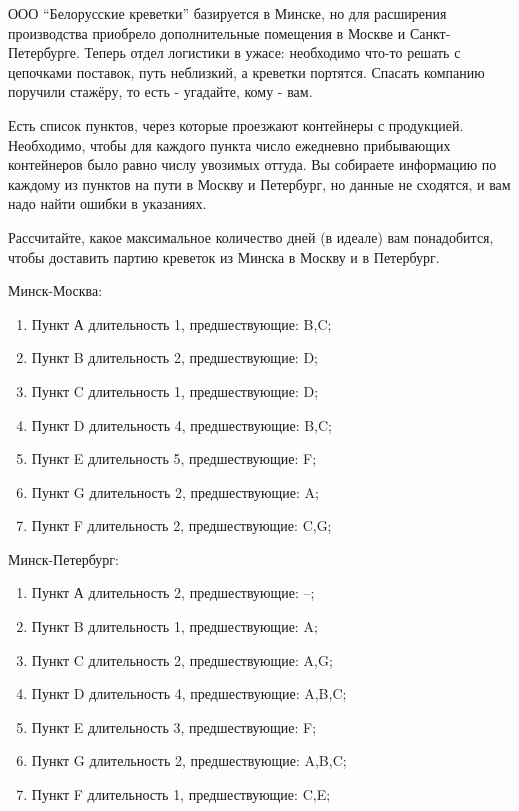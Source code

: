 \question
ООО “Белорусские креветки” базируется в Минске, но для расширения производства приобрело дополнительные помещения в Москве и Санкт-Петербурге. Теперь отдел логистики в ужасе: необходимо что-то решать с цепочками поставок, путь неблизкий, а креветки портятся. Спасать компанию поручили стажёру, то есть - угадайте, кому - вам.

Есть список пунктов, через которые проезжают контейнеры с продукцией. Необходимо, чтобы для каждого пункта число ежедневно прибывающих контейнеров было равно числу увозимых оттуда. Вы собираете информацию по каждому из пунктов на пути в Москву и Петербург, но данные не сходятся, и вам надо найти ошибки в указаниях.

Рассчитайте, какое максимальное количество дней (в идеале) вам понадобится, чтобы доставить партию креветок из Минска в Москву и в Петербург.


Минск-Москва:
\begin{enumerate}
\item Пункт А длительность 1, предшествующие: B,C;
\item Пункт B длительность 2, предшествующие: D;
\item Пункт C длительность 1, предшествующие: D;
\item Пункт D длительность 4, предшествующие: B,C;
\item Пункт E длительность 5, предшествующие: F;
\item Пункт G длительность 2, предшествующие: A;
\item Пункт F длительность 2, предшествующие: C,G;
\end{enumerate}
Минск-Петербург:
\begin{enumerate}
\item Пункт А длительность 2, предшествующие: –;
\item Пункт B длительность 1, предшествующие: A;
\item Пункт C длительность 2, предшествующие: A,G;
\item Пункт D длительность 4, предшествующие: A,B,C;
\item Пункт E длительность 3, предшествующие: F;
\item Пункт G длительность 2, предшествующие: A,B,C;
\item Пункт F длительность 1, предшествующие: C,E;
\end{enumerate}
